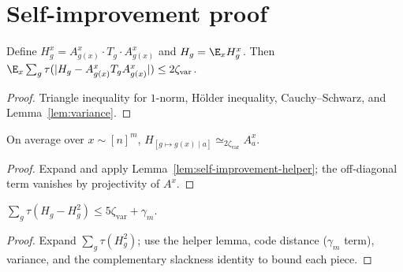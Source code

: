\section{Self-improvement proof}

\begin{lemma}\label{lem:self-improvement-helper}
  Define $H^x_g=A^x_{g(x)}\cdot T_g\cdot A^x_{g(x)}$ and
  $H_g=\E_x H^x_g$. Then
  $\E_x\sum_g\tau(|H_g-A^x_{g(x)}T_gA^x_{g(x)}|)\le 2\zeta_{\mathrm{var}}$.
\end{lemma}
\begin{proof}
  Triangle inequality for $1$-norm, H\"older inequality, Cauchy--Schwarz,
  and Lemma~\ref{lem:variance}.
\end{proof}

\begin{lemma}\label{lem:si-cons}
  On average over $x\sim[n]^m$,
  $H_{[g\mapsto g(x)\mid a]}\simeq_{2\zeta_{\mathrm{var}}} A^x_a$.
\end{lemma}
\begin{proof}
  Expand and apply Lemma~\ref{lem:self-improvement-helper};
  the off-diagonal term vanishes by projectivity of $A^x$.
\end{proof}

\begin{lemma}[Projectivity of $H$]\label{lem:si-proj}
  $\sum_g\tau(H_g-H_g^2)\le 5\zeta_{\mathrm{var}}+\gamma_m$.
\end{lemma}
\begin{proof}
  Expand $\sum_g\tau(H_g^2)$; use the helper lemma, code distance
  ($\gamma_m$ term), variance, and the complementary slackness identity
  to bound each piece.
\end{proof}

